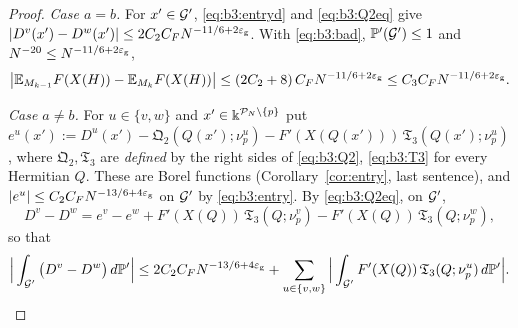 \begin{proof}
\emph{Case $a=b$.} For $x'\in\mathcal{G}'$, \eqref{eq:b3:entryd} and \eqref{eq:b3:Q2eq} give $|D^v(x')-D^w(x')|\le2C_2C_FN^{-11/6+2\varepsilon_{\mathrm g}}$. With \eqref{eq:b3:bad}, $\mathbb{P}'(\mathcal{G}')\le1$ and $N^{-20}\le N^{-11/6+2\varepsilon_{\mathrm g}}$,
\[
\big|\mathbb{E}_{M_{k-1}}F(X(H))-\mathbb{E}_{M_k}F(X(H))\big|\le(2C_2+8)\,C_FN^{-11/6+2\varepsilon_{\mathrm g}}\le C_3C_FN^{-11/6+2\varepsilon_{\mathrm g}}.
\]

\emph{Case $a\ne b$.} For $u\in\{v,w\}$ and $x'\in\Bbbk^{\mathcal P_N\setminus\{p\}}$ put $e^u(x'):=D^u(x')-\mathfrak Q_2(Q(x');\nu^u_p)-F'(X(Q(x')))\,\mathfrak T_3(Q(x');\nu^u_p)$, where $\mathfrak Q_2,\mathfrak T_3$ are \emph{defined} by the right sides of
\eqref{eq:b3:Q2}, \eqref{eq:b3:T3} for every Hermitian $Q$. These are Borel functions (Corollary~\ref{cor:entry}, last sentence), and $|e^u|\le C_2C_FN^{-13/6+4\varepsilon_{\mathrm g}}$ on $\mathcal{G}'$ by \eqref{eq:b3:entry}. By \eqref{eq:b3:Q2eq}, on $\mathcal{G}'$,
\[
D^v-D^w=e^v-e^w+F'(X(Q))\,\mathfrak T_3(Q;\nu^v_p)-F'(X(Q))\,\mathfrak T_3(Q;\nu^w_p),
\]
so that
\begin{equation}\label{eq:b3:good2}
\Big|\int_{\mathcal{G}'}\big(D^v-D^w\big)\,d\mathbb{P}'\Big|\le2C_2C_FN^{-13/6+4\varepsilon_{\mathrm g}}+\sum_{u\in\{v,w\}}\Big|\int_{\mathcal{G}'}F'(X(Q))\,\mathfrak T_3(Q;\nu^u_p)\,d\mathbb{P}'\Big| .
\end{equation}


\end{proof}
